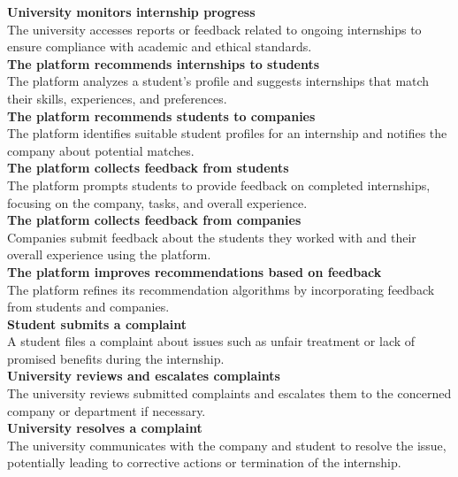 \textbf{University monitors internship progress}\\
The university accesses reports or feedback related to ongoing internships to ensure compliance with academic and ethical standards.\\

\textbf{The platform recommends internships to students}\\
The platform analyzes a student’s profile and suggests internships that match their skills, experiences, and preferences.\\

\textbf{The platform recommends students to companies}\\
The platform identifies suitable student profiles for an internship and notifies the company about potential matches.\\

\textbf{The platform collects feedback from students}\\
The platform prompts students to provide feedback on completed internships, focusing on the company, tasks, and overall experience.\\

\textbf{The platform collects feedback from companies}\\
Companies submit feedback about the students they worked with and their overall experience using the platform.\\

\textbf{The platform improves recommendations based on feedback}\\
The platform refines its recommendation algorithms by incorporating feedback from students and companies.\\

\textbf{Student submits a complaint}\\
A student files a complaint about issues such as unfair treatment or lack of promised benefits during the internship.\\

\textbf{University reviews and escalates complaints}\\
The university reviews submitted complaints and escalates them to the concerned company or department if necessary.\\

\textbf{University resolves a complaint}\\
The university communicates with the company and student to resolve the issue, potentially leading to corrective actions or termination of the internship.\\